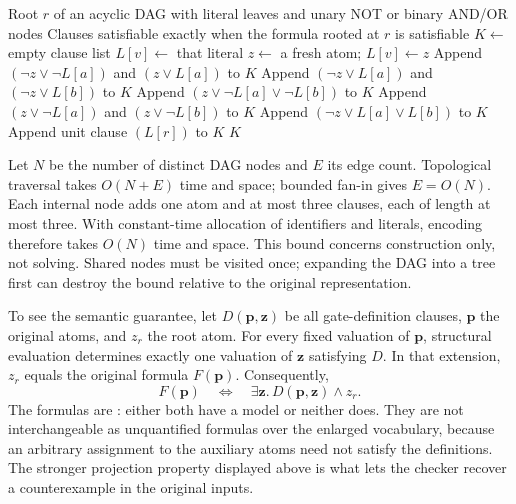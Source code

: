 \begin{algorithm}
\caption{Encode a Boolean formula DAG as a satisfiability-equivalent CNF.}
\label{alg:ch41-encode}
\begin{pseudocode}
\Require Root $r$ of an acyclic DAG with literal leaves and unary NOT or binary AND/OR nodes
\Ensure Clauses satisfiable exactly when the formula rooted at $r$ is satisfiable
\State $K\gets$ empty clause list
    \State $L[v]\gets$ that literal
  \Else
    \State $z\gets$ a fresh atom; $L[v]\gets z$
      \State Append $(\neg z\lor\neg L[a])$ and $(z\lor L[a])$ to $K$
      \State Append $(\neg z\lor L[a])$ and $(\neg z\lor L[b])$ to $K$
      \State Append $(z\lor\neg L[a]\lor\neg L[b])$ to $K$
    \Else {}
      \State Append $(z\lor\neg L[a])$ and $(z\lor\neg L[b])$ to $K$
      \State Append $(\neg z\lor L[a]\lor L[b])$ to $K$
    \EndIf
  \EndIf
\EndFor
\State Append unit clause $(L[r])$ to $K$
\State \Return $K$
\end{pseudocode}
\end{algorithm}

Let $N$ be the number of distinct DAG nodes and $E$ its edge count.
Topological traversal takes $O(N+E)$ time and space; bounded fan-in gives $E=O(N)$.
Each internal node adds one atom and at most three clauses, each of length at most three.
With constant-time allocation of identifiers and literals, encoding therefore takes $O(N)$ time and space.
This bound concerns construction only, not solving.
Shared nodes must be visited once; expanding the DAG into a tree first can destroy the bound relative to the original representation.

To see the semantic guarantee, let $D(\mathbf p,\mathbf z)$ be all gate-definition clauses, $\mathbf p$ the original atoms, and $z_r$ the root atom.
For every fixed valuation of $\mathbf p$, structural evaluation determines exactly one valuation of $\mathbf z$ satisfying $D$.
In that extension, $z_r$ equals the original formula $F(\mathbf p)$.
Consequently,
\[
 F(\mathbf p)\quad\Longleftrightarrow\quad
 \exists\mathbf z.\,D(\mathbf p,\mathbf z)\land z_r.
\]
The formulas are : either both have a model or neither does.
They are not interchangeable as unquantified formulas over the enlarged vocabulary, because an arbitrary assignment to the auxiliary atoms need not satisfy the definitions.
The stronger projection property displayed above is what lets the checker recover a counterexample in the original inputs.


